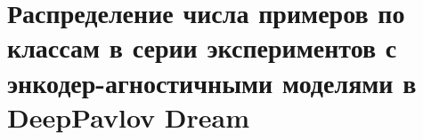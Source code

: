 \chapter{Распределение числа примеров по классам в серии экспериментов с энкодер-агностичными моделями в DeepPavlov Dream}
\label{appendix:dream-tr-ag-sizes}
\begin{table}[]
\caption{Pаспределение числа тренировочных примеров по классам в серии экспериментов с энкодер-агностичными моделями в DeepPavlov Dream. Глава~\ref{ch:mtldream}. Классификация эмоций.}
\label{appendix:emo_tr-ag}
\end{table}
\begin{table}[]
\caption{Pаспределение числа тренировочных примеров по классам в серии экспериментов с энкодер-агностичными моделями в DeepPavlov Dream. Глава~\ref{ch:mtldream}. Классификация тональности.}
\label{appendix:sentiment_tr-ag}
\end{table}

